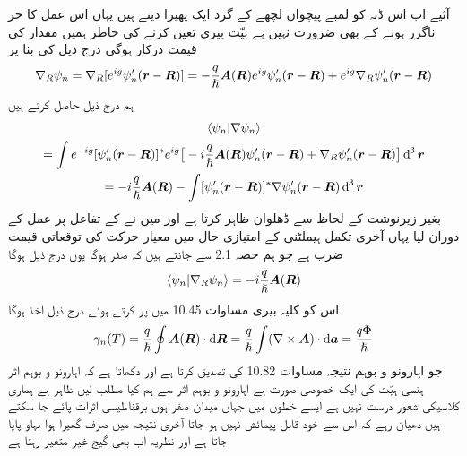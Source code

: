  آئیے اب اس ڈبہ کو لمبے پیچواں لچھے کے گرد ایک پھیرا دیتے ہیں یہاں اس عمل کا حر ناگزر ہونے کے بھی ضرورت نہیں ہے ہیّت بیری تعین کرنے کی خاطر ہمیں مقدار  کی قیمت درکار ہوگی درج ذیل کی بنا پر 
\begin{align*}
\nabla_R \psi_n = \nabla_R [e^{i g} \psi'_n ({{\boldsymbol{r}}} - {{\boldsymbol{R}}})] = - \frac{q}{\hslash} {{\boldsymbol{A}}} ({{\boldsymbol{R}}}) e^{i g} \psi'_n ({{\boldsymbol{r}}} - {{\boldsymbol{R}}}) + e^{i g} \nabla_R \psi'_n ({{\boldsymbol{r}}} - {{\boldsymbol{R}}})
\end{align*}
ہم درج ذیل حاصل کرتے ہیں 
\begin{multline}
\langle \psi_n | \nabla \psi_n \rangle \\
= \int e^{- i g} [\psi'_n (\kvec{r} - \kvec{R})]^{*} e^{i g} \big [ - i \frac{q}{\hslash} \kvec{A} (\kvec{R}) \psi'_n (\kvec{r} - \kvec{R}) + \nabla_R \psi'_n (\kvec{r} - \kvec{R}) \big ] \dif^{\,3} \kvec{r} \\
= - i \frac{q}{\hslash} \kvec{A} (\kvec{R}) - \int [\psi'_n (\kvec{r} - \kvec{R})]^{*} \nabla \psi'_n (\kvec{r} - \kvec{R}) \dif^{\,3} \kvec{r}
\end{multline}
بغیر زیرنوشت   کے لحاظ سے ڈھلوان ظاہر کرتا ہے اور میں نے  کے تفاعل پر عمل کے دوران  لیا یہاں آخری تکمل ہیملٹنی  کے امتیازی حال میں معیار حرکت کی توقعاتی قیمت ضرب   ہے جو ہم حصہ 2.1 سے جانتے ہیں کہ صفر ہوگا یوں درج ذیل ہوگا 
\begin{align}
\langle \psi_n | \nabla_R \psi_n \rangle = - i \frac{q}{\hslash} {{\boldsymbol{A}}} ({{\boldsymbol{R}}})
\end{align}
اس کو کلیہ بیری مساوات 10.45 میں پر کرتے ہوئے درج ذیل اخذ ہوگا 
\begin{align}
\gamma_n (T) = \frac{q}{\hslash} \oint \kvec{A} (\kvec{R}) \cdot \dif \kvec{R} = \frac{q}{\hslash} \int (\nabla \times \kvec{A}) \cdot \dif \kvec{a} = \frac{q \Phi}{\hslash}
\end{align}
جو اہارونو و بوہم نتیجہ مساوات 10.82 کی تصدیق کرتا ہے اور دکھاتا ہے کہ اہارونو و بوہم اثر ہنسی ہیّت کی ایک خصوصی صورت ہے اہارونو و بوہم اثر سے ہم کیا مطلب ليں ظاہر ہے ہماری کلاسیکی شعور درست نہیں ہے ایسے خطوں میں جہاں میدان صفر ہوں برقناطیسی اثرات پائے جا سکتے ہیں دھیان رہے کہ اس سے  خود قابل پیمائش نہیں ہو جاتا آخری نتیجہ میں صرف گھیرا ہوا بہاو پایا جاتا ہے اور نظریہ اب بھی گیج غیر متغیر رہتا ہے 

